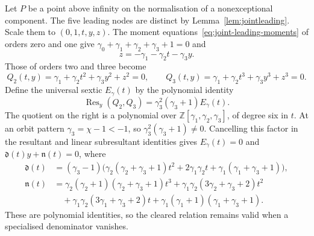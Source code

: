 \documentclass[11pt]{article}
\theoremstyle{definition}
\theoremstyle{remark}
\begin{document}
Let $P$ be a point above infinity on the normalisation of a nonexceptional component.
The five leading nodes are distinct by Lemma~\ref{lem:jointleading}.
Scale them to $(0,1,t,y,z)$. The moment equations~\eqref{eq:joint-leading-moments}
of orders zero and one give $\gamma_0+\gamma_1+\gamma_2+\gamma_3+1=0$ and
\[
 z=-\gamma_1-\gamma_2t-\gamma_3y.
\]
Those of orders two and three become
\[
 Q_2(t,y)=\gamma_1+\gamma_2t^2+\gamma_3y^2+z^2=0,\qquad
 Q_3(t,y)=\gamma_1+\gamma_2t^3+\gamma_3y^3+z^3=0.
\]
Define the universal sextic $E_\gamma(t)$ by the polynomial identity
\begin{equation}\label{eq:branchsextic}
 \operatorname{Res}_y(Q_2,Q_3)=\gamma_3^2(\gamma_3+1)E_\gamma(t).
\end{equation}
The quotient on the right is a polynomial over
$\mathbb Z[\gamma_1,\gamma_2,\gamma_3]$, of degree six in $t$.
At an orbit pattern $\gamma_3=\chi-1<-1$, so
$\gamma_3^2(\gamma_3+1)\ne0$. Cancelling this factor in the resultant
and linear subresultant identities gives $E_\gamma(t)=0$ and
$\mathfrak d(t)y+\mathfrak n(t)=0$, where
\begin{align*}
 \mathfrak d(t)&=(\gamma_3-1)\bigl(\gamma_2(\gamma_2+\gamma_3+1)t^2
            +2\gamma_1\gamma_2t+\gamma_1(\gamma_1+\gamma_3+1)\bigr),\\
 \mathfrak n(t)&=\gamma_2(\gamma_2+1)(\gamma_2+\gamma_3+1)t^3
       +\gamma_1\gamma_2(3\gamma_2+\gamma_3+2)t^2\\
     &\quad+\gamma_1\gamma_2(3\gamma_1+\gamma_3+2)t
       +\gamma_1(\gamma_1+1)(\gamma_1+\gamma_3+1).
\end{align*}
These are polynomial identities, so the cleared relation remains valid when
a specialised denominator vanishes.
\end{document}

